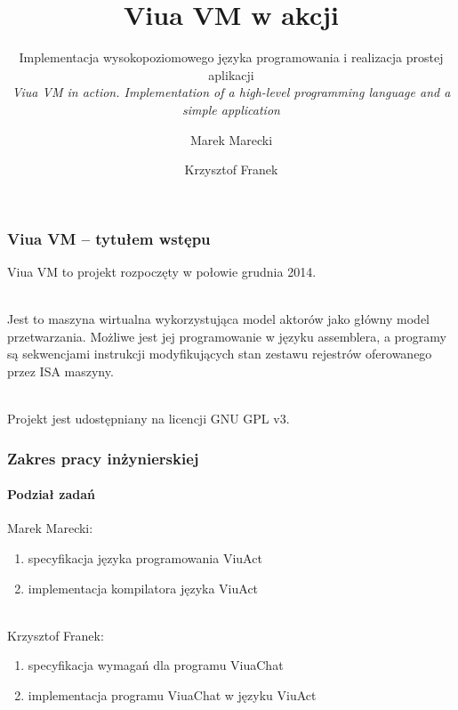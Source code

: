 \documentclass{beamer}
\title{Viua VM w akcji}
\subtitle{Implementacja wysokopoziomowego języka programowania i realizacja prostej aplikacji
\\
\emph{Viua VM in action. Implementation of a high-level programming language and a simple application}}
\author{Marek Marecki \and Krzysztof Franek}
\begin{document}


\frame{\titlepage}

\begin{frame}
    \frametitle{Viua VM -- tytułem wstępu}

    Viua VM to projekt rozpoczęty w połowie grudnia 2014.

    ~\\

    Jest to maszyna wirtualna wykorzystująca model aktorów jako główny model przetwarzania.
    Możliwe jest jej programowanie w języku assemblera, a programy są sekwencjami instrukcji modyfikujących
    stan zestawu rejestrów oferowanego przez ISA maszyny.

    ~\\

    Projekt jest udostępniany na licencji GNU GPL v3.
\end{frame}

\begin{frame}
    \frametitle{Zakres pracy inżynierskiej}
    \framesubtitle{Podział zadań}

    Marek Marecki:
    \begin{enumerate}
        \item specyfikacja języka programowania ViuAct
        \item implementacja kompilatora języka ViuAct
    \end{enumerate}

    ~\\

    Krzysztof Franek:
    \begin{enumerate}
        \item specyfikacja wymagań dla programu ViuaChat
        \item implementacja programu ViuaChat w języku ViuAct
    \end{enumerate}
\end{frame}
\end{document}
